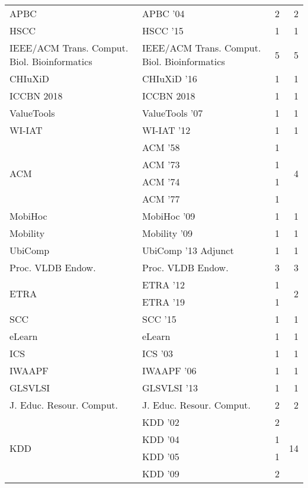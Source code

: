 \begin{table*}[t]
\begin{tabular}{llrr}
\multirow{1}{*}{APBC } & APBC '04 & 2 & \multirow{1}{*}{2}\\
\multirow{1}{*}{HSCC } & HSCC '15 & 1 & \multirow{1}{*}{1}\\
\multirow{1}{*}{IEEE/ACM Trans. Comput. Biol. Bioinformatics} & IEEE/ACM Trans. Comput. Biol. Bioinformatics & 5 & \multirow{1}{*}{5}\\
\multirow{1}{*}{CHIuXiD } & CHIuXiD '16 & 1 & \multirow{1}{*}{1}\\
\multirow{1}{*}{ICCBN 2018} & ICCBN 2018 & 1 & \multirow{1}{*}{1}\\
\multirow{1}{*}{ValueTools } & ValueTools '07 & 1 & \multirow{1}{*}{1}\\
\multirow{1}{*}{WI-IAT } & WI-IAT '12 & 1 & \multirow{1}{*}{1}\\
\multirow{4}{*}{ACM } & ACM '58 & 1 & \multirow{4}{*}{4}\\
& ACM '73 & 1 &\\
& ACM '74 & 1 &\\
& ACM '77 & 1 &\\
\multirow{1}{*}{MobiHoc } & MobiHoc '09 & 1 & \multirow{1}{*}{1}\\
\multirow{1}{*}{Mobility } & Mobility '09 & 1 & \multirow{1}{*}{1}\\
\multirow{1}{*}{UbiComp } & UbiComp '13 Adjunct & 1 & \multirow{1}{*}{1}\\
\multirow{1}{*}{Proc. VLDB Endow.} & Proc. VLDB Endow. & 3 & \multirow{1}{*}{3}\\
\multirow{2}{*}{ETRA } & ETRA '12 & 1 & \multirow{2}{*}{2}\\
& ETRA '19 & 1 &\\
\multirow{1}{*}{SCC } & SCC '15 & 1 & \multirow{1}{*}{1}\\
\multirow{1}{*}{eLearn} & eLearn & 1 & \multirow{1}{*}{1}\\
\multirow{1}{*}{ICS } & ICS '03 & 1 & \multirow{1}{*}{1}\\
\multirow{1}{*}{IWAAPF } & IWAAPF '06 & 1 & \multirow{1}{*}{1}\\
\multirow{1}{*}{GLSVLSI } & GLSVLSI '13 & 1 & \multirow{1}{*}{1}\\
\multirow{1}{*}{J. Educ. Resour. Comput.} & J. Educ. Resour. Comput. & 2 & \multirow{1}{*}{2}\\
\multirow{10}{*}{KDD } & KDD '02 & 2 & \multirow{10}{*}{14}\\
& KDD '04 & 1 &\\
& KDD '05 & 1 &\\
& KDD '09 & 2 &\\

\end{tabular}
\end{table*}
